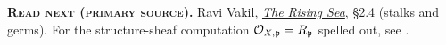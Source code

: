 \begin{primarybox}
\textbf{\textsc{\color{accentB}Read next (primary source).}}\quad
Ravi Vakil, \href{https://math.stanford.edu/~vakil/216blog/FOAGaug2922public.pdf}{\emph{The Rising Sea}},
\S2.4 (stalks and germs). For the structure-sheaf computation $\mathcal{O}_{X,\mathfrak{p}}=R_{\mathfrak{p}}$ spelled out, see
.
\end{primarybox}
